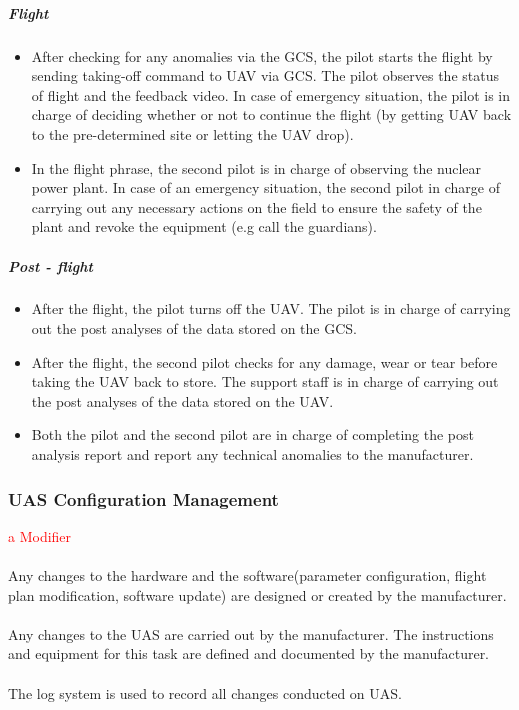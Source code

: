 \documentclass[]{article}
\begin{document}
	\subparagraph{Flight}
	\begin{itemize}
		\item After checking for any anomalies via the GCS, the pilot starts the flight by sending taking-off command to UAV via GCS. The pilot observes the status of flight and the feedback video. In case of emergency situation, the pilot is in charge of deciding whether or not to continue the flight (by getting UAV back to the pre-determined site or letting the UAV drop).
		\item In the flight phrase, the second pilot is in charge of observing the nuclear power plant. In case of an emergency situation, the second pilot in charge of carrying out any necessary actions on the field to ensure the safety of the plant and revoke the equipment (e.g call the guardians).
	\end{itemize}
	\subparagraph{Post - flight}
	\begin{itemize}
	\item After the flight, the pilot turns off the UAV. The pilot is in charge of carrying out the post analyses of the data stored on the GCS.
	\item After the flight, the second pilot checks for any damage, wear or tear before taking the UAV back to store. The support staff is in charge of carrying out the post analyses of the data stored on the UAV.
	\item Both the pilot and the second pilot are in charge of completing the post analysis report and report any technical anomalies to the manufacturer. 
	\end{itemize}

	\subsubsection {UAS Configuration Management} \textcolor{red}{a Modifier}
	\paragraph{} Any changes to the hardware and the software(parameter configuration, flight plan modification, software update) are designed or created by the manufacturer.
	\paragraph{} Any changes to the UAS are carried out by the manufacturer. The instructions and equipment for this task are defined and documented by the manufacturer. 
	\paragraph{} The log system is used to record all changes conducted on UAS.
	
\end{document}
